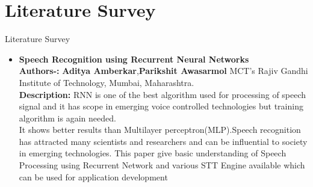 \documentclass{beamer}
\begin{document}
	\section{Literature Survey}
	\begin{frame}[allowframebreaks]{Literature Survey}
	\begin{itemize}
		
		\item   \textbf{Speech Recognition using Recurrent  Neural Networks} \\
		\textbf{Authors-:} \textbf{Aditya Amberkar},\textbf{Parikshit Awasarmol} MCT’s Rajiv Gandhi Institute of Technology, Mumbai, Maharashtra. \\
			\vspace{0.5cm}
		\textbf{Description:} RNN is one of the best algorithm used for processing of speech  signal  and  it  has  scope  in  emerging  voice controlled  technologies  but  training  algorithm  is  again needed. \\
		\vspace{0.5cm}
		It  shows  better  results  than  Multilayer perceptron(MLP).Speech  recognition  has  attracted many scientists and researchers and can be influential to society in  emerging  technologies.  This  paper  give  basic understanding  of  Speech  Processing  using  Recurrent Network and various STT Engine available which can be used for application development
		

\end{itemize}
\end{frame}
\end{document}
